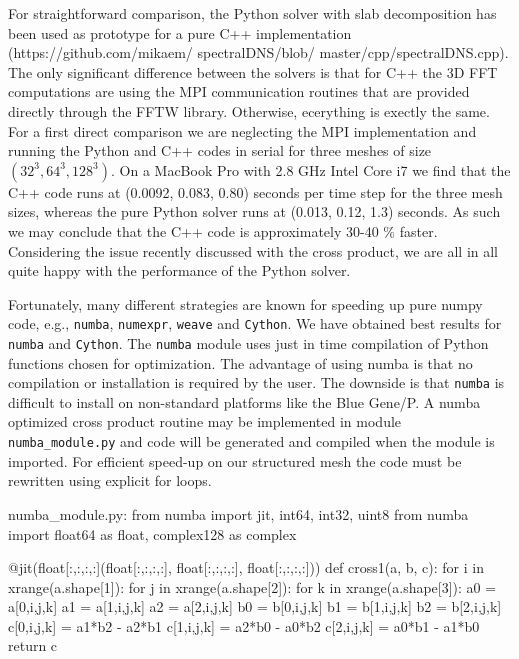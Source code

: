 \documentclass[11pt, oneside]{article}
\newcommand{\inpyth}{\lstinline[style=pythonstyle, basicstyle=\ttfamily]} %[]%
\begin{document}
For straightforward comparison, the Python solver with slab decomposition has been used as prototype for a 
pure C++ implementation (https://github.com/mikaem/ spectralDNS/blob/ master/cpp/spectralDNS.cpp). The 
only significant difference between the solvers is that for C++ the 3D FFT computations are using the MPI communication routines that are provided directly through the FFTW library. Otherwise, ecerything is exectly the same. For a first direct comparison we are neglecting the MPI implementation and running the Python and C++ codes in serial for three meshes of size 
$(32^3, 64^3, 128^3)$. On a 
MacBook Pro with 2.8 GHz Intel Core i7 we find that the C++ code runs at (0.0092, 0.083, 0.80) seconds per time step for the three mesh sizes, whereas the pure Python solver runs at (0.013, 0.12, 1.3) seconds. As such we may conclude that the C++ code is approximately 30-40 \% faster. Considering the issue recently 
discussed with the cross product, we are all in all quite happy with the performance of the Python solver.  

Fortunately, many different strategies are known for speeding up pure numpy code, e.g.,  \inpyth{numba}, \inpyth{numexpr}, \inpyth{weave} and \inpyth{Cython}. We have obtained best results for \inpyth{numba} and \inpyth{Cython}. The \inpyth{numba} module uses just in time compilation of Python functions chosen for optimization. The advantage of using numba is that no compilation or installation is required by the user. The downside is that \inpyth{numba} is difficult to install on non-standard platforms like the Blue Gene/P. A numba optimized cross product routine may be implemented in module \inpyth{numba_module.py} and code will be generated and compiled when the module is imported.  For efficient speed-up on our structured mesh the code must be rewritten using explicit for loops. 

\begin{python}
numba_module.py:
from numba import jit, int64, int32, uint8
from numba import float64 as float, complex128 as complex

@jit(float[:,:,:,:](float[:,:,:,:], float[:,:,:,:], float[:,:,:,:]))
def cross1(a, b, c):
    for i in xrange(a.shape[1]):
        for j in xrange(a.shape[2]):
            for k in xrange(a.shape[3]):
                a0 = a[0,i,j,k]
                a1 = a[1,i,j,k]
                a2 = a[2,i,j,k]
                b0 = b[0,i,j,k]
                b1 = b[1,i,j,k]
                b2 = b[2,i,j,k]
                c[0,i,j,k] = a1*b2 - a2*b1
                c[1,i,j,k] = a2*b0 - a0*b2
                c[2,i,j,k] = a0*b1 - a1*b0
    return c
\end{python}
\end{document}
